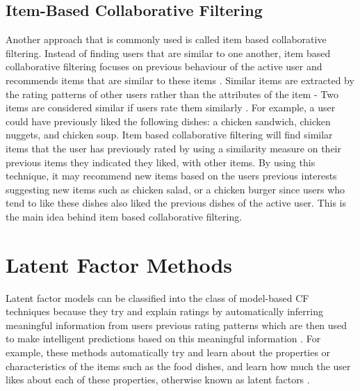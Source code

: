 \subsection{Item-Based Collaborative Filtering}

Another approach that is commonly used is called item based collaborative filtering. Instead of finding users that are similar to one another, item based collaborative filtering focuses on previous behaviour of the active user and recommends items that are similar to these items \cite{mahoutaction}. Similar items are extracted by the rating patterns of other users rather than the attributes of the item - Two items are considered similar if users rate them similarly \cite{schafer2007collaborative}. For example, a user could have previously liked the following dishes: a chicken sandwich, chicken nuggets, and chicken soup. Item based collaborative filtering will find similar items that the user has previously rated by using a similarity measure on their previous items they indicated they liked, with other items. By using this technique, it may recommend new items based on the users previous interests suggesting new items such as chicken salad, or a chicken burger since users who tend to like these dishes also liked the previous dishes of the active user. This is the main idea behind item based collaborative filtering. 


\section{Latent Factor Methods}



Latent factor models can be classified into the class of model-based CF techniques because they try and explain ratings by automatically inferring meaningful information from users previous rating patterns which are then used to make intelligent predictions based on this meaningful information \cite{survey}. For example, these methods automatically try and learn about the properties or characteristics of the items such as the food dishes, and learn how much the user likes about each of these properties, otherwise known as latent factors \cite{koren2011}. 

